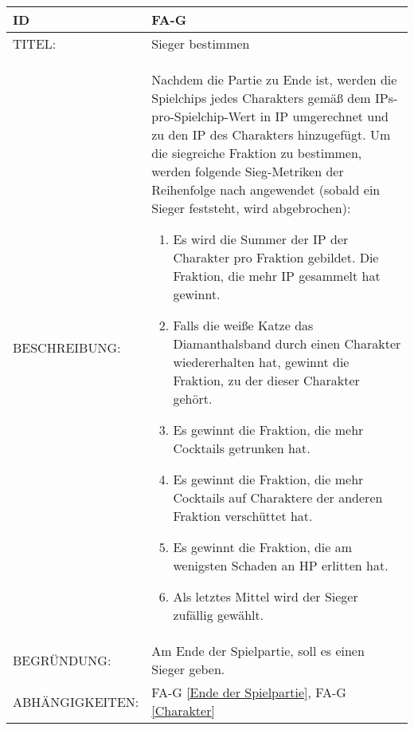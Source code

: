 \begin{tabularx}{16cm}{l|X}
	{table}\label{Sieger bestimmen}
	\textbf{ID} & \textbf{FA-G \arabic{table}} \\
	\hline
	TITEL: & Sieger bestimmen \\
	\hline
	BESCHREIBUNG: & Nachdem die Partie zu Ende ist, werden die Spielchips jedes Charakters gemäß dem IPs-pro-Spielchip-Wert in IP umgerechnet und zu den IP des Charakters hinzugefügt. Um die siegreiche Fraktion zu bestimmen, werden folgende Sieg-Metriken der Reihenfolge nach angewendet (sobald ein Sieger feststeht, wird abgebrochen):
	\begin{enumerate}
		\item Es wird die Summer der IP der Charakter pro Fraktion gebildet. Die Fraktion, die mehr IP gesammelt hat gewinnt.
		\item Falls die weiße Katze das Diamanthalsband durch einen Charakter wiedererhalten hat, gewinnt die Fraktion, zu der dieser Charakter gehört.
		\item Es gewinnt die Fraktion, die mehr Cocktails getrunken hat.
		\item Es gewinnt die Fraktion, die mehr Cocktails auf Charaktere der anderen Fraktion verschüttet hat.
		\item Es gewinnt die Fraktion, die am wenigsten Schaden an HP erlitten hat.
		\item Als letztes Mittel wird der Sieger zufällig gewählt.
	\end{enumerate}\\
	\hline
	BEGRÜNDUNG: & Am Ende der Spielpartie, soll es einen Sieger geben. \\
	\hline
	ABHÄNGIGKEITEN: & FA-G \ref{Ende der Spielpartie}, FA-G \ref{Charakter} \\
\end{tabularx}
